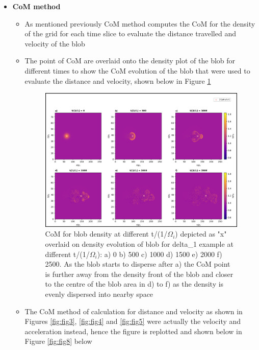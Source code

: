 \documentclass{article}
\begin{document}
\begin{arrowlist}
\begin{itemize}
            \item \textbf{CoM method}
            \begin{itemize}
                \item As mentioned previously CoM method computes the CoM for the density of the grid for each time slice to evaluate the distance travelled and velocity of the blob
                \item The point of CoM are overlaid onto the density plot of the blob for different times to show the CoM evolution of the blob that were used to evaluate the distance and velocity, shown below in Figure \ref{fig:fig7}

    \begin{figure}[H]
        \centering
            \includegraphics[width=\textwidth]{./Fig/Fig7 vel n CoM hmap t0_t50}
            \normalsize{\caption{CoM for blob density at different t/(1/$\Omega_i$) depicted as "x" overlaid on density evolution of blob for delta\_1 example at different t/(1/$\Omega_i$): a) 0 b) 500 c) 1000 d) 1500 e) 2000 f) 2500. As the blob starts to disperse after a) the CoM point is further away from the density front of the blob and closer to the centre of the blob area in d) to f) as the density is evenly dispersed into nearby space}
            \label{fig:fig7}}
        \end{figure}   
        
                \item The CoM method of calculation for distance and velocity as shown in Figures \ref{fig:fig3}, \ref{fig:fig4} and \ref{fig:fig5} were actually the velocity and acceleration instead, hence the figure is replotted and shown below in Figure \ref{fig:fig8} below


\end{itemize}
\end{itemize}
\end{arrowlist}
\end{document}

